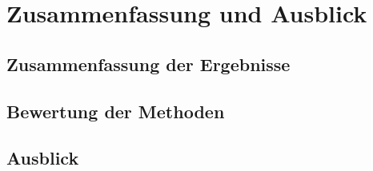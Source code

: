 \chapter{Zusammenfassung und Ausblick}
\label{ch:zusammenfassung}

\section{Zusammenfassung der Ergebnisse}
\label{sec:zusammenfassung}

\section{Bewertung der Methoden}
\label{sec:bewertung}

\section{Ausblick}
\label{sec:ausblick}
